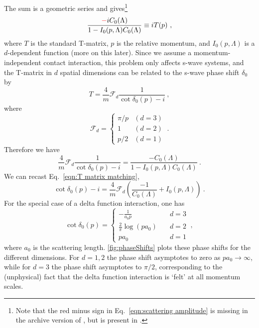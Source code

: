 \documentclass[11pt]{article}
\begin{document}
\noindent The sum is a geometric series and gives\footnote{Note that the {\color{red} red} minus sign in Eq.~\eqref{eqn:scattering amplitude} is missing in the archive version of \cite{Beane:2003da}, but is present in \cite{Kaplan:1998we}.}
\begin{equation}\label{eqn:scattering amplitude}
\frac{{\color{red}-}iC_0(\Lambda)}{1-I_0(p,\Lambda)C_0(\Lambda)}\equiv iT(p)\ ,
\end{equation}
where $T$ is the standard T-matrix, $p$ is the relative momentum,  and $I_0(p,\Lambda)$ is a $d$-dependent function (more on this later).  Since we assume a momentum-independent contact interaction, this problem only affects s-wave systems, and the T-matrix in $d$ spatial dimensions can be related to the s-wave phase shift $\delta_0$ by
\begin{equation}
T=\frac{4}{m}\mathcal{F}_d\frac{1}{\cot \delta_0(p)-i}\ ,
\end{equation}
where
\begin{equation}
\mathcal{F}_d=
\begin{cases}
\pi/p & (d=3)\\
1 & (d=2)\\
p/2 & (d=1)
\end{cases}\ .
\end{equation}
Therefore we have
\begin{equation}\label{eqn:T matrix matching}
\boxed{
\frac{4}{m}\mathcal{F}_d\frac{1}{\cot \delta_0(p)-i}=\frac{-C_0(\Lambda)}{1-I_0(p,\Lambda)C_0(\Lambda)}
}\ .
\end{equation}
We can recast Eq.~\eqref{eqn:T matrix matching},
\begin{equation}\label{eqn:matching}
\cot \delta_0(p)-i=\frac{4}{m}\mathcal{F}_d\left(\frac{-1}{C_0(\Lambda)}+I_0(p,\Lambda)\right)\ .
\end{equation}
For the special case of a delta function interaction, one has \cite{busch1998}
\begin{equation}\label{eqn:phase shifts}
\cot \delta_0(p) = 
\begin{cases}
 - \frac{1}{a _ { 0 }p }&\quad d=3  \\ 
\frac { 2 } { \pi } \log \left( p a _ { 0 } \right) & \quad d=2\\ 
 p a _ { 0 } &\quad d=1
 \end{cases}\ ,
\end{equation}
where $a_0$ is the scattering length. \autoref{fig:phaseShifts} plots these phase shifts for the different dimensions.  For $d=1,2$ the phase shift asymptotes to zero as $pa_0\to\infty$, while for $d=3$ the phase shift asymptotes to $\pi/2$, corresponding to the (unphysical) fact that the delta function interaction is `felt' at all momentum scales.
\end{document}
